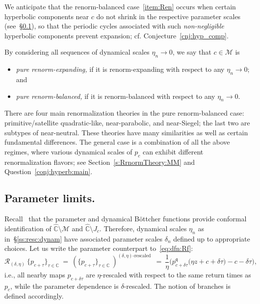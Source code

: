 \documentclass[twoside,leqno]{article}
\theoremstyle{plain}
\newcommand{\C}{{\mathbb{C}}}
\newcommand{\wC}{{\widehat{\mathbb{C}}}}
\newcommand\MM{{\mathcal{M}}}
\newcommand\Jul{J}
\newcommand{\qq}{\mathfrak{q}}
\newcommand{\RR}{{\mathcal R}}
\begin{document}
 \noindent We anticipate that the renorm-balanced case~\ref{item:Ren} occurs when certain hyperbolic components near $c$ do not shrink in the respective parameter scales (see~\S\ref{ss:resc:param}), so that the periodic cycles associated with such \emph{non-negligible} hyperbolic components prevent expansion; cf. Conjecture~\ref{cnj:hyp_comp}.
 
 
 By considering all sequences of dynamical scales $\eta_n\to 0$, we say that $c\in \MM$ is 
\begin{itemize}
    \item \emph{pure renorm-expanding,} if it is renorm-expanding with respect to any $\eta_n\to 0$; and
    \item \emph{pure renorm-balanced,} if it is renorm-balanced with respect to any $\eta_n\to 0$.
\end{itemize}


There are four main renormalization theories in the pure renorm-balanced case: primitive/satellite quadratic-like, near-parabolic, and near-Siegel; the last two are subtypes of near-neutral. These theories have many similarities as well as certain fundamental differences. The general case is a combination of all the above regimes, where various dynamical scales of $p_c$ can exhibit different renormalization flavors; see Section~\ref{s:RrnormTheory:MM} and Question~\ref{conj:hyperb:main}.












\subsection{Parameter limits.}\label{ss:resc:param} Recall~\cite{DH1} that the parameter and dynamical B\"ottcher functions provide conformal identification of $\wC\setminus \MM$ and $\wC\setminus \Jul_c$. Therefore, dynamical scales $\eta_n$ as in~\S\ref{ss:resc:dynam} have associated parameter scales $\delta_n$ defined up to appropriate choices. Let us write the parameter counterpart to~\eqref{eq:dfn:Rf}:
\begin{equation}
    \label{eq:dfn:R:MM} \RR_{(\delta,\eta)} \ \big\{p_{c+\tau}\big\}_{\tau\in \C}\ =\ \left(\big\{p_{c+\tau}\big\}_{\tau\in \C}\ \right)^\text{$(\delta, \eta)$-rescaled}\  \ =\ \frac{1}{\eta}\Big(p_{c+\delta \tau}^{\qq} \big(\eta z+c+\delta \tau\big)-c-\delta \tau\Big),
\end{equation}
i.e., all nearby maps $p_{c+\delta \tau}$ are $\eta$-rescaled with respect to the same return times as $p_c$, while the parameter dependence is $\delta$-rescaled. The notion of branches is defined accordingly. 
\end{document}
